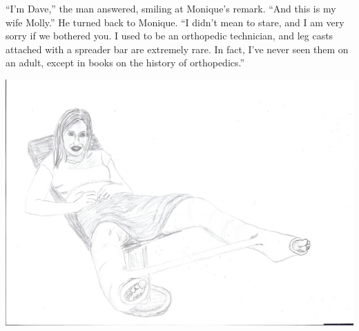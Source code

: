 ``I'm Dave,'' the man answered, smiling at Monique's remark. ``And this is my wife Molly.'' He
turned back to Monique. ``I didn't mean to stare, and I am very sorry if we bothered you. I used
to be an orthopedic technician, and leg casts attached with a spreader bar are extremely rare.
In fact, I've never seen them on an adult, except in books on the history of orthopedics.''

\begin{center}
\includegraphics[width=\textwidth]{images/kicks43.jpg}
\end{center}
